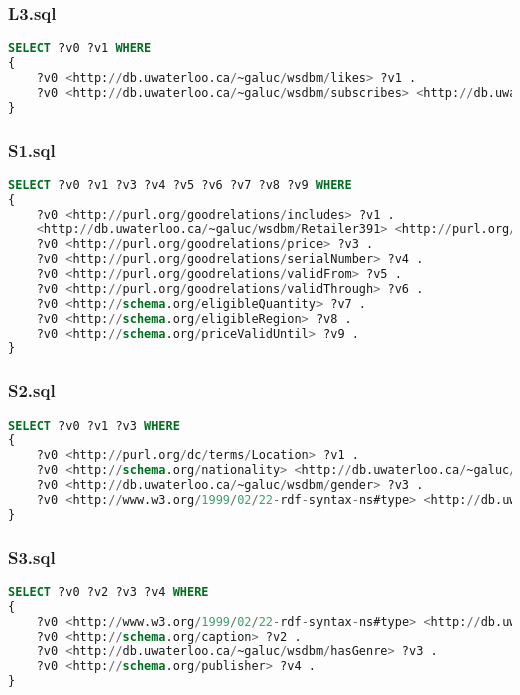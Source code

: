 \documentclass[titlepage, a4paper, 12pt] {article}
\begin{document}
\subsubsection{L3.sql}

\begin{lstlisting}[language=SQL]
SELECT ?v0 ?v1 WHERE 
{
	?v0 <http://db.uwaterloo.ca/~galuc/wsdbm/likes> ?v1 .
	?v0 <http://db.uwaterloo.ca/~galuc/wsdbm/subscribes> <http://db.uwaterloo.ca/~galuc/wsdbm/Website20769> .
}
\end{lstlisting}

\subsubsection{S1.sql}

\begin{lstlisting}[language=SQL]
SELECT ?v0 ?v1 ?v3 ?v4 ?v5 ?v6 ?v7 ?v8 ?v9 WHERE 
{
	?v0 <http://purl.org/goodrelations/includes> ?v1 .
	<http://db.uwaterloo.ca/~galuc/wsdbm/Retailer391> <http://purl.org/goodrelations/offers> ?v0 .
	?v0 <http://purl.org/goodrelations/price> ?v3 .
	?v0 <http://purl.org/goodrelations/serialNumber> ?v4 .
	?v0 <http://purl.org/goodrelations/validFrom> ?v5 .
	?v0 <http://purl.org/goodrelations/validThrough> ?v6 .
	?v0 <http://schema.org/eligibleQuantity> ?v7 .
	?v0 <http://schema.org/eligibleRegion> ?v8 .
	?v0 <http://schema.org/priceValidUntil> ?v9 .
}
\end{lstlisting}

\subsubsection{S2.sql}

\begin{lstlisting}[language=SQL]
SELECT ?v0 ?v1 ?v3 WHERE 
{
	?v0 <http://purl.org/dc/terms/Location> ?v1 .
	?v0 <http://schema.org/nationality> <http://db.uwaterloo.ca/~galuc/wsdbm/Country23> .
	?v0 <http://db.uwaterloo.ca/~galuc/wsdbm/gender> ?v3 .
	?v0 <http://www.w3.org/1999/02/22-rdf-syntax-ns#type> <http://db.uwaterloo.ca/~galuc/wsdbm/Role2> .
}
\end{lstlisting}

\subsubsection{S3.sql}

\begin{lstlisting}[language=SQL]
SELECT ?v0 ?v2 ?v3 ?v4 WHERE 
{
	?v0 <http://www.w3.org/1999/02/22-rdf-syntax-ns#type> <http://db.uwaterloo.ca/~galuc/wsdbm/ProductCategory12> .
	?v0 <http://schema.org/caption> ?v2 .
	?v0 <http://db.uwaterloo.ca/~galuc/wsdbm/hasGenre> ?v3 .
	?v0 <http://schema.org/publisher> ?v4 .
}
\end{lstlisting}
\end{document}
